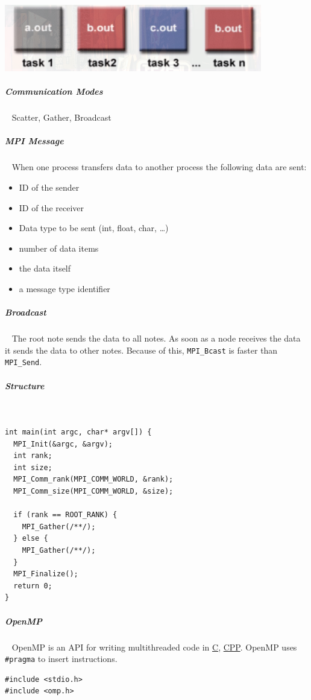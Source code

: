 \documentclass[8pt,twoside,landscape]{extarticle}
\begin{document}
\begin{multicols}{5}
{
\begin{center}
\includegraphics[width=.9\linewidth]{img/mpmd_model.png}
\end{center}
\label{fig:mpmd}
}
\subparagraph{Communication Modes} \
\label{sec:org5186ebf}
Scatter, Gather, Broadcast
\subparagraph{MPI Message} \
\label{sec:org50ad26e}
When one process transfers data to another process the following data are sent:
\begin{itemize}
\item ID of the sender
\item ID of the receiver
\item Data type to be sent (int, float, char, \ldots{})
\item number of data items
\item the data itself
\item a message type identifier
\end{itemize}
\subparagraph{Broadcast} \
\label{sec:orgdb6e4df}
The root note sends the data to all notes.
As soon as a node receives the data it sends the data to other notes.
Because of this, \texttt{MPI\_Bcast} is faster than \texttt{MPI\_Send}.
\subparagraph{Structure} \
\label{sec:org3d5809d}
\lstset{language=C,label= ,caption= ,captionpos=b,numbers=none}
\begin{lstlisting}
int main(int argc, char* argv[]) {
  MPI_Init(&argc, &argv);
  int rank;
  int size;
  MPI_Comm_rank(MPI_COMM_WORLD, &rank);
  MPI_Comm_size(MPI_COMM_WORLD, &size);

  if (rank == ROOT_RANK) {
    MPI_Gather(/**/);
  } else {
    MPI_Gather(/**/);
  }
  MPI_Finalize();
  return 0;
}
\end{lstlisting}
\subparagraph{OpenMP} \
\label{sec:org21a8486}
OpenMP is an API for writing multithreaded code in \href{../../../roam/20211008113512-c.org}{C}, \href{../../../roam/20210920103243-c.org}{CPP}.
OpenMP uses \texttt{\#pragma} to insert instructions.

\lstset{language=C,label= ,caption= ,captionpos=b,numbers=none}
\begin{lstlisting}
#include <stdio.h>
#include <omp.h>


\end{lstlisting}
\end{multicols}
\end{document}
